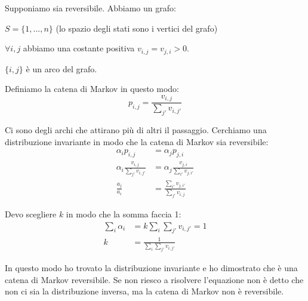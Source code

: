 \documentclass[a4paper,12pt]{book}
\newcommand\ddfrac[2]{\frac{\displaystyle #1}{\displaystyle #2}}
\begin{document}
Supponiamo sia reversibile. %
Abbiamo un grafo:
\begin{multicols}{2}
	
	
	$ S = \{1,...,n\} $ (lo spazio degli stati sono i vertici del grafo)
	
	$ \forall i,j $ abbiamo una costante positiva $ v_{i,j} = v_{j,i} > 0 $.
	
	$ \{i,j\} $ è un arco del grafo.
\end{multicols}

Definiamo la catena di Markov in questo modo:
$$ p_{i,j} = \ddfrac{v_{i,j}}{\sum_{j'}v_{i,j'}} $$

Ci sono degli archi che attirano più di altri il passaggio. Cerchiamo una distribuzione invariante in modo che la catena di Markov sia reversibile:
\begin{align*}
	\alpha_{i}p_{i,j} & = \alpha_{j}p_{j,i} \\
	\alpha_{i}\ddfrac{v_{i,j}}{\sum_{j'}v_{i,j'}} & = 	\alpha_{j}\ddfrac{v_{j,i}}{\sum_{i'}v_{j,i'}} \\
	\ddfrac{a_j}{a_i} & = \frac{\sum_{i'}v_{j,i'}}{\sum_{j'}v_{i,j}}
\end{align*}

Devo scegliere $ k $ in modo che la somma faccia 1:
\begin{align*}
	\sum_{i}\alpha_{i} & = k\sum_{i}\sum_{j'}v_{i,j'} = 1 \\
	k & = \ddfrac{1}{\sum_{i}\sum_{j'}v_{i,j'}}
\end{align*}

In questo modo ho trovato la distribuzione invariante e ho dimostrato che è una catena di Markov reversibile. Se non riesco a risolvere l'equazione non è detto che non ci sia la distribuzione inversa, ma la catena di Markov non è reversibile. 
\end{document}
